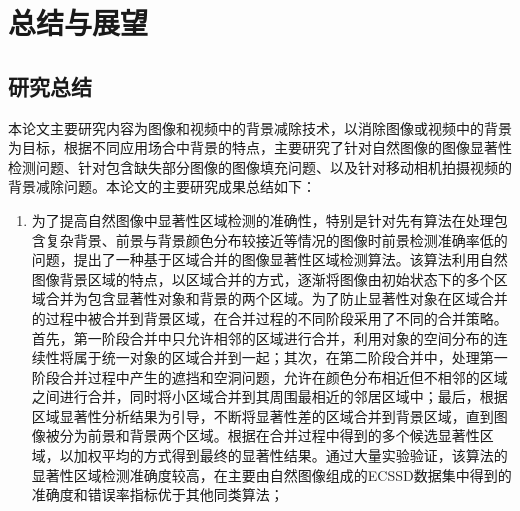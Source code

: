 \chapter{总结与展望}
\label{ch6:Summary}

\section{研究总结}
\label{ch6:sec:summary}
本论文主要研究内容为图像和视频中的背景减除技术，以消除图像或视频中的背景为目标，根据不同应用场合中背景的特点，主要研究了针对自然图像的图像显著性检测问题、针对包含缺失部分图像的图像填充问题、以及针对移动相机拍摄视频的背景减除问题。本论文的主要研究成果总结如下：
\begin{enumerate}
  \item 为了提高自然图像中显著性区域检测的准确性，特别是针对先有算法在处理包含复杂背景、前景与背景颜色分布较接近等情况的图像时前景检测准确率低的问题，提出了一种基于区域合并的图像显著性区域检测算法。该算法利用自然图像背景区域的特点，以区域合并的方式，逐渐将图像由初始状态下的多个区域合并为包含显著性对象和背景的两个区域。为了防止显著性对象在区域合并的过程中被合并到背景区域，在合并过程的不同阶段采用了不同的合并策略。首先，第一阶段合并中只允许相邻的区域进行合并，利用对象的空间分布的连续性将属于统一对象的区域合并到一起；其次，在第二阶段合并中，处理第一阶段合并过程中产生的遮挡和空洞问题，允许在颜色分布相近但不相邻的区域之间进行合并，同时将小区域合并到其周围最相近的邻居区域中；最后，根据区域显著性分析结果为引导，不断将显著性差的区域合并到背景区域，直到图像被分为前景和背景两个区域。根据在合并过程中得到的多个候选显著性区域，以加权平均的方式得到最终的显著性结果。通过大量实验验证，该算法的显著性区域检测准确度较高，在主要由自然图像组成的ECSSD数据集中得到的准确度和错误率指标优于其他同类算法；
      

\end{enumerate}
